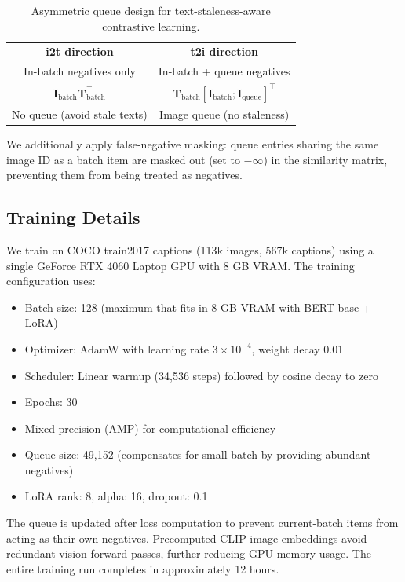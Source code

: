\documentclass[10pt,leqno]{amsart}
\begin{document}
\begin{table}[h]
\centering
\caption{Asymmetric queue design for text-staleness-aware contrastive learning.}
\label{tab:queue}
\begin{tabular}{c|c}
\hline
\textbf{i2t direction} & \textbf{t2i direction} \\
In-batch negatives only & In-batch + queue negatives \\
\hline
$\mathbf{I}_{\text{batch}} \mathbf{T}_{\text{batch}}^{\top}$ & $\mathbf{T}_{\text{batch}} [\mathbf{I}_{\text{batch}}; \mathbf{I}_{\text{queue}}]^{\top}$ \\
No queue (avoid stale texts) & Image queue (no staleness) \\
\hline
\end{tabular}
\end{table}

We additionally apply false-negative masking: queue entries sharing the same image ID as a batch item are masked out (set to $-\infty$) in the similarity matrix, preventing them from being treated as negatives.

\subsection{Training Details}

We train on COCO train2017 captions (113k images, 567k captions) using a single GeForce RTX 4060 Laptop GPU with 8 GB VRAM. The training configuration uses:
\begin{itemize}
    \item Batch size: 128 (maximum that fits in 8 GB VRAM with BERT-base + LoRA)
    \item Optimizer: AdamW with learning rate $3\times 10^{-4}$, weight decay 0.01
    \item Scheduler: Linear warmup (34,536 steps) followed by cosine decay to zero
    \item Epochs: 30
    \item Mixed precision (AMP) for computational efficiency
    \item Queue size: 49,152 (compensates for small batch by providing abundant negatives)
    \item LoRA rank: 8, alpha: 16, dropout: 0.1
\end{itemize}
The queue is updated after loss computation to prevent current-batch items from acting as their own negatives. Precomputed CLIP image embeddings avoid redundant vision forward passes, further reducing GPU memory usage. The entire training run completes in approximately 12 hours.
\end{document}
